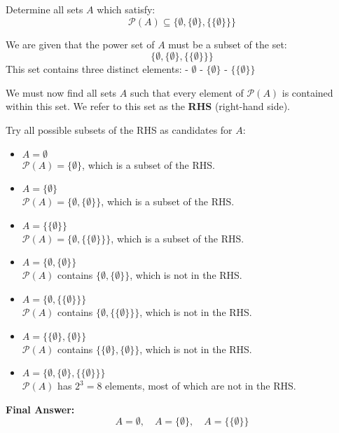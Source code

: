 \documentclass{article}
\begin{document}
Determine all sets $A$ which satisfy:
\[
\mathcal{P}(A) \subseteq \{\emptyset, \{\emptyset\}, \{\{\emptyset\}\}\}
\]

We are given that the power set of $A$ must be a subset of the set:
\[
\{\emptyset, \{\emptyset\}, \{\{\emptyset\}\}\}
\]
This set contains three distinct elements:
- $\emptyset$
- $\{\emptyset\}$
- $\{\{\emptyset\}\}$

We must now find all sets $A$ such that every element of $\mathcal{P}(A)$ is contained within this set.  
We refer to this set as the \textbf{RHS} (right-hand side).

Try all possible subsets of the RHS as candidates for $A$:

\begin{itemize}
  \item $A = \emptyset$\\
  $\mathcal{P}(A) = \{\emptyset\}$, which is a subset of the RHS.

  \item $A = \{\emptyset\}$\\
  $\mathcal{P}(A) = \{\emptyset, \{\emptyset\}\}$, which is a subset of the RHS.

  \item $A = \{\{\emptyset\}\}$\\
  $\mathcal{P}(A) = \{\emptyset, \{\{\emptyset\}\}\}$, which is a subset of the RHS.

  \item $A = \{\emptyset, \{\emptyset\}\}$\\
  $\mathcal{P}(A)$ contains $\{\emptyset, \{\emptyset\}\}$, which is not in the RHS.

  \item $A = \{\emptyset, \{\{\emptyset\}\}\}$\\
  $\mathcal{P}(A)$ contains $\{\emptyset, \{\{\emptyset\}\}\}$, which is not in the RHS.

  \item $A = \{\{\emptyset\}, \{\emptyset\}\}$\\
  $\mathcal{P}(A)$ contains $\{\{\emptyset\}, \{\emptyset\}\}$, which is not in the RHS.

  \item $A = \{\emptyset, \{\emptyset\}, \{\{\emptyset\}\}\}$\\
  $\mathcal{P}(A)$ has $2^3 = 8$ elements, most of which are not in the RHS.
\end{itemize}

\textbf{Final Answer:}
\[
\boxed{
A = \emptyset,\quad
A = \{\emptyset\},\quad
A = \{\{\emptyset\}\}
}
\]
\end{document}
